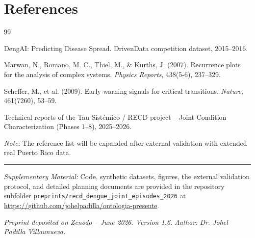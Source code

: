 \documentclass[11pt,a4paper]{article}
\begin{document}
\section*{References}
\begin{thebibliography}{99}

DengAI: Predicting Disease Spread. DrivenData competition dataset, 2015--2016.

Marwan, N., Romano, M. C., Thiel, M., \& Kurths, J. (2007). Recurrence plots for the analysis of complex systems. \textit{Physics Reports}, 438(5-6), 237--329.

Scheffer, M., et al. (2009). Early-warning signals for critical transitions. \textit{Nature}, 461(7260), 53--59.

Technical reports of the Tau Sistémico / RECD project – Joint Condition Characterization (Phases 1--8), 2025--2026.

\end{thebibliography}

\noindent\textit{Note:} The reference list will be expanded after external validation with extended real Puerto Rico data.

\vspace{0.6em}
\hrule
\vspace{0.5em}
\begin{sloppypar}
\noindent\textit{Supplementary Material:} Code, synthetic datasets, figures, the external validation protocol, and detailed planning documents are provided in the repository subfolder \texttt{preprints/recd\_dengue\_joint\_episodes\_2026} at \url{https://github.com/johelpadilla/ontologia-presente}.
\end{sloppypar}

\vspace{0.6em}
\noindent\textit{Preprint deposited on Zenodo – June 2026. Version 1.6.}  
\noindent\textit{Author: Dr. Johel Padilla Villaunueva.}
\end{document}
